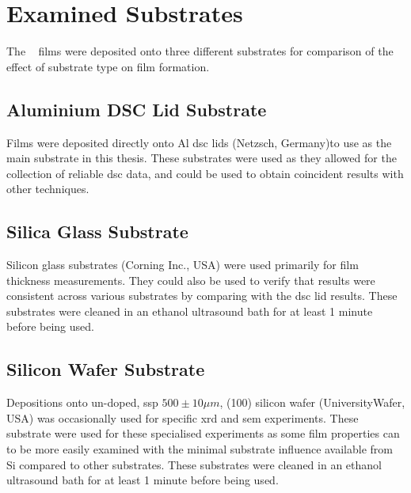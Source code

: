 \section{Examined Substrates} 
The \MgZnCa~ films were deposited onto three different substrates for comparison of the effect of substrate type on film formation.

\subsection{Aluminium DSC Lid Substrate}
Films were deposited directly onto Al \gls{dsc} lids (Netzsch, Germany)to use as the main substrate in this thesis. These substrates were used as they allowed for the collection of reliable \gls{dsc} data, and could be used to obtain coincident results with other techniques. 

\subsection{Silica Glass Substrate}
Silicon glass substrates (Corning Inc., USA) were used primarily for film thickness measurements. They could also be used to verify that results were consistent across various substrates by comparing with the \gls{dsc} lid results. These substrates were cleaned in an ethanol ultrasound bath for at least 1 minute before being used. 

\subsection{Silicon Wafer Substrate}
Depositions onto un-doped, \gls{ssp} $500 \pm 10 \mu m$,  (100) silicon wafer (UniversityWafer, USA) was occasionally used for specific \gls{xrd} and \gls{sem} experiments. These substrate were used for these specialised experiments as some film properties can to be more easily examined with the minimal substrate influence available from Si compared to other substrates. These substrates were cleaned in an ethanol ultrasound bath for at least 1 minute before being used. 

